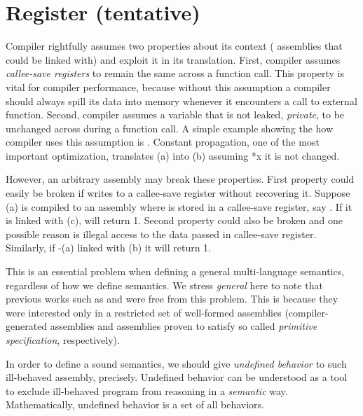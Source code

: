 {\section{Register (tentative)}\label{sec:overview:register}
Compiler rightfully assumes two properties about its context (\ie{} assemblies that could be linked with) and exploit it in its translation.
First, compiler assumes \textit{callee-save registers} to remain the same across a function call.
This property is vital for compiler performance, because without this assumption a compiler should always spill its data into memory whenever it encounters a call to external function.
Second, compiler assumes a variable that is not leaked, \ie{} \textit{private}, to be unchanged across during a function call.
A simple example showing the how compiler uses this assumption is .
Constant propagation, one of the most important optimization, translates (a) into (b) assuming *x it is not changed.

However, an arbitrary assembly may break these properties.
First property could easily be broken if  writes to a callee-save register without recovering it.
Suppose (a) is compiled to an assembly where  is stored in a callee-save register, say .
If it is linked with (c),  will return 1.
Second property could also be broken and one possible reason is illegal access to the data passed in callee-save register. %
Similarly, if -(a) linked with (b) it will return 1.

This is an essential problem when defining a general multi-language semantics, regardless of how we define semantics.
We stress \textit{general} here to note that previous works such as \scc{} and \ccx{} were free from this problem.
This is because they were interested only in a restricted set of well-formed assemblies (compiler-generated assemblies and assemblies proven to satisfy so called \textit{primitive specification}, respectively).

In order to define a sound semantics, we should give \textit{undefined behavior} to such ill-behaved assembly, precisely.
Undefined behavior can be understood as a tool to exclude ill-behaved program from reasoning in a \textit{semantic} way.
Mathematically, undefined behavior is a set of all behaviors.



}
